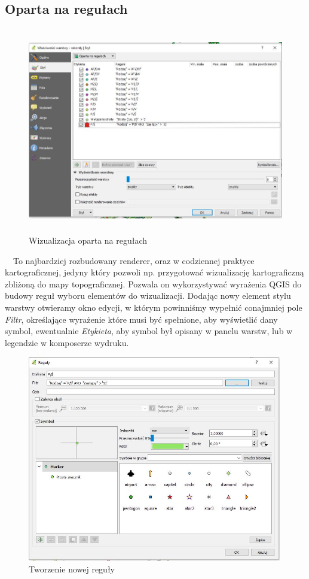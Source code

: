 \documentclass[12pt,a4paper]{book}
\begin{document}
\subsection{Oparta na regułach}
\begin{figure}[!ht]
	\centering
	\includegraphics[width=13cm,height=9.00cm]{007-reguly.jpg}
	\caption{Wizualizacja oparta na regułach}
\end{figure}
\ \ To najbardziej rozbudowany  renderer, oraz w codziennej praktyce kartograficznej, jedyny który pozwoli np. przygotować wizualizację kartograficzną zbliżoną do mapy topograficznej. Pozwala on wykorzystywać wyrażenia QGIS do budowy reguł wyboru elementów do wizualizacji. Dodając nowy element stylu warstwy otwieramy okno edycji, w którym powinniśmy wypełnić conajmniej pole \textit{Filtr}, określające wyrażenie które musi być spełnione, aby wyświetlić dany symbol, ewentualnie \textit{Etykieta}, aby symbol był opisany w panelu warstw, lub w legendzie w komposerze wydruku.
\begin{figure}[ht]
	\centering
	\includegraphics[height=9.00cm]{007-nowa-regula.jpg}
	\caption{Tworzenie nowej reguły}
\end{figure}
\end{document}
